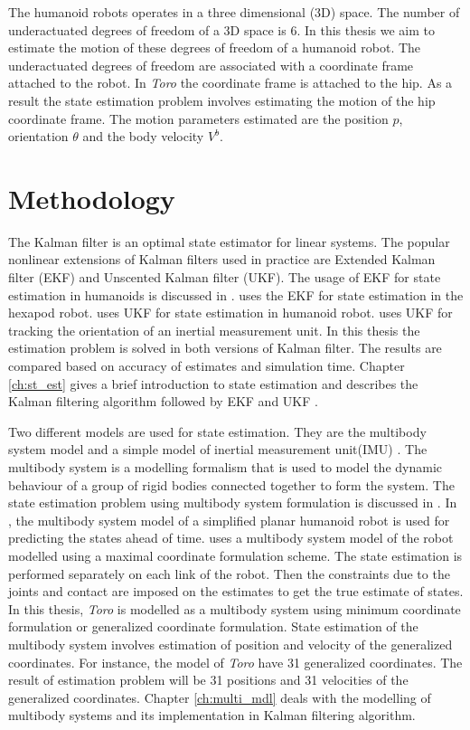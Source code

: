    The humanoid robots operates in a three dimensional (3D) space. The number of underactuated degrees of freedom of a 3D space is 6. 
   In this thesis we aim to estimate the motion of these degrees of freedom of a humanoid robot. The underactuated degrees of freedom are associated with a coordinate frame attached to the robot. In \emph{Toro} the coordinate frame is attached to the hip. As a result the state estimation problem involves estimating the motion of the hip coordinate frame. The motion parameters estimated are the position $p$, orientation $\theta$ and the body velocity $V^b$.

 \section{Methodology} 
The Kalman filter is an optimal state estimator for linear systems. The popular nonlinear extensions of Kalman filters used in practice are Extended Kalman filter (EKF) and Unscented Kalman filter (UKF). The usage of EKF for state estimation in humanoids is discussed in \citep{atk12}. \citep{bloe12} uses the EKF for state estimation in the hexapod robot. \citep{oli12} uses UKF for state estimation in humanoid robot. \citep{edg03} uses UKF for tracking the orientation of an inertial measurement unit. In this thesis the estimation problem is solved in both versions of Kalman filter. The results are compared based on accuracy of estimates and simulation time. Chapter \ref{ch:st_est} gives a brief introduction to state estimation and describes the Kalman filtering algorithm followed by EKF and UKF .

    Two different models are used for state estimation. They are the multibody system model and a simple model of  inertial measurement unit(IMU) \citep{bloe12}. The multibody system is a modelling formalism that is used to model the dynamic behaviour of a group of rigid bodies connected together to form the system. The state estimation problem using multibody system formulation is discussed in \citep{atk12}. In \citep{atk12}, the multibody system model of a simplified planar humanoid robot is used for predicting the states ahead of time. \citep{oli12} uses a multibody system model of the robot modelled using a maximal coordinate formulation scheme. The state estimation is performed separately on each link of the robot. Then the constraints due to the joints and contact are imposed on the estimates to get the true estimate of states. In this thesis, \emph{Toro} is modelled as a multibody system using minimum coordinate formulation or generalized coordinate formulation. State estimation of the multibody system involves estimation of position and velocity of the generalized coordinates. For instance, the model of \emph{Toro} have 31 generalized coordinates. The result of estimation problem will be 31 positions and 31 velocities of the generalized coordinates. Chapter \ref{ch:multi_mdl} deals with the modelling of multibody systems and its implementation in Kalman filtering algorithm. 
    
